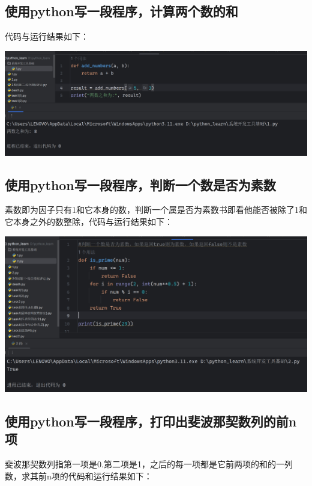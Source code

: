 \documentclass[UTF8,a4paper]{ctexart}
\begin{document}
\begin{sloppypar}
	\subsection{使用python写一段程序，计算两个数的和}
	代码与运行结果如下：

	\includegraphics[width = 16cm]{12}
	
	\subsection{使用python写一段程序，判断一个数是否为素数}
	素数即为因子只有1和它本身的数，判断一个属是否为素数书即看他能否被除了1和它本身之外的数整除，代码与运行结果如下：

	\includegraphics[width = 16cm]{13}

	\subsection{使用python写一段程序，打印出斐波那契数列的前n项}
	斐波那契数列指第一项是0.第二项是1，之后的每一项都是它前两项的和的一列数，求其前n项的代码和运行结果如下：
	

\end{sloppypar}
\end{document}
